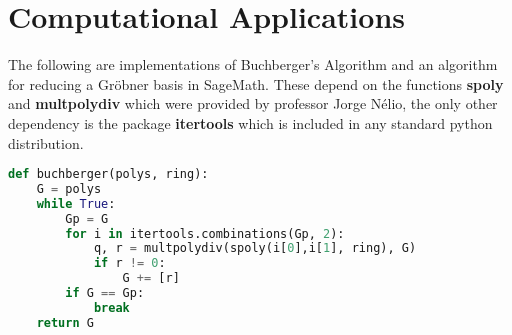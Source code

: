 \documentclass[a4paper,12pt]{article}
\begin{document}
\section{Computational Applications}
The following are implementations of Buchberger's Algorithm and an algorithm for reducing a Gr\"obner basis in SageMath. These depend on the functions \textbf{spoly} and \textbf{multpolydiv} which were provided by professor Jorge Nélio, the only other dependency is the package \textbf{itertools} which is included in any standard python distribution.

\begin{lstlisting}[language=Python, caption={Buchberger's Algorithm}]
def buchberger(polys, ring):
	G = polys
	while True:
		Gp = G
		for i in itertools.combinations(Gp, 2):
			q, r = multpolydiv(spoly(i[0],i[1], ring), G)
			if r != 0:
				G += [r]
		if G == Gp:
			break
	return G
\end{lstlisting}
\end{document}
